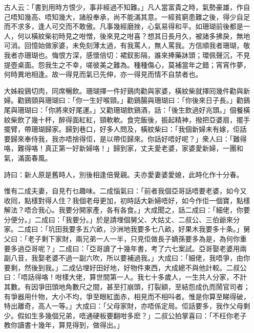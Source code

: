 \documentclass[a5paper, 12pt, openany]{book} %
\begin{document}
	古人云：「書到用時方恨少，事非經過不知難。」凡人當富貴之時，氣勢豪雄，作自己唔知幾高、唔知幾大，諸般奉承，尚不能滿其意。一經貧窮患難之後，得少自足而不求多，逢人可交而不敢傲。凡事幾經磨挫，心氣易得和平。如珊瑚前後都是一人，何以橫紋柴初時見之咁憎，後來見之咁喜？想其日長月久，被諸多拂戾，無地可消。回憶始做家婆，未免刻薄太過，有我罵人，無人罵我。方信順我者珊瑚，敬我者亦珊瑚也。悔恨方深，感懷倍切：裙釵影隔，誰來捧藥牀頭；環佩聲沉，不見提壺桌面。怨我生之不幸，嗟彼美之難為。種種傷心，莫補當年之錯；宵宵作夢，何時異地相逢。故一得見而氣已先伸，亦一得見而情不自禁者也。

	大姊殺鷄切肉，同席暢飲。珊瑚擇一件好鷄肉勸與家婆，橫紋柴就擇囘幾件勸與新婦。勸鷄頸與珊瑚曰：「你一生好喉頸。」勸鷄腸與珊瑚曰：「你後來日子長。」勸鷄尾與珊瑚曰：「你將來好尾運。」又勸珊瑚飲鷄酒，話：「後生飲過好兆頭。」個餐橫紋柴飲了幾十杯，醉得面紅紅，頸軟軟。食完飯後，振起精神，撥把亞婆扇，擺手擺臂，帶珊瑚歸家。歸到巷口，好多人問及，橫紋柴曰：「我個新婦未有嫁，佢話要歸來奉侍我，我亦唔捨得佢，是以帶佢歸來。你話好唔好呢？」衆人曰：「難得咯，難得咯！真正第一好新婦咯！」歸到家，丈夫愛老婆，家婆愛新婦，一團和氣，滿面春風。

	詩曰：新人原是舊時人，別後相逢倍覺親。夫亦愛妻婆愛媳，此時化作十分春。

	惟有二成夫妻，自見冇乜趣味。二成惱氣曰：「前者我個亞哥話唔要老婆，如今又收囘，點樣對得人住？我個老母更加，初時話大新婦唔好，如今作佢一個寶，點樣解法？唔合我心。我要分開家產，各有各食。」大成聞之，話二成曰：「細佬，你要分便分。」二成曰：「我要分。」於是請埋個舅父、大姑丈、二叔公、三伯爺來分家。二成曰：「坑田我要多五六畝，沙洲地我要多七八畝，好果木我要多十条。」舅父曰：「老子剩下家財，兩兄弟一人一半，只見佢做長子嫡孫要多為是，為何你重要多過亞哥呢？」二成曰：「亞哥讀了十幾年書，考了六七案試。亞哥娶老婆用兩副八音，我娶老婆不過一副六吹，所以要補過我。」大成曰：「細佬，我唔爭，由你要剩，然後到我。」二成佔埋好田好地，好物件東西，大成總不與他計較。二叔公曰：「唔話得咯！咁樣大佬，算世間第一人。我七十多歲人，一生共人分家，不計其數。有因爭田頭地角數尺之間，甚至打崩頭，打裂額，至結怨成仇而鬧官司者；有爭器用什物，大小不均，爭至眼紅面赤，相見而不相呌者。惟是你算至睇得破，特出離奇，高人一等。」大成曰：「父母家財，亦唔係定局。佢話要多，我作父母剩少。假如生多幾個兄弟，唔通硬板要翻咁多麽？」二叔公拍掌喜曰：「不枉你老子教你讀書十幾年，算見得到，做得出。」
\end{document}
